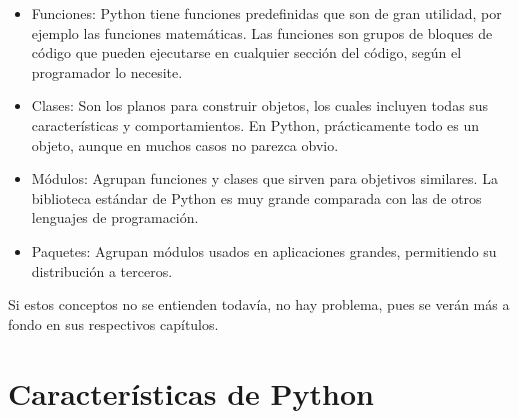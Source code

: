\documentclass{report}
\begin{document}
\begin{itemize}
  \item Funciones: Python tiene funciones predefinidas que son de gran utilidad, por ejemplo las funciones matemáticas. Las funciones son grupos de bloques de código que pueden ejecutarse en cualquier sección del código, según el programador lo necesite.
  
  \item Clases: Son los planos para construir objetos, los cuales incluyen todas sus características y comportamientos. En Python, prácticamente todo es un objeto, aunque en muchos casos no parezca obvio.
  
  \item Módulos: Agrupan funciones y clases que sirven para objetivos similares. La biblioteca estándar de Python es muy grande comparada con las de otros lenguajes de programación.
  
  \item Paquetes: Agrupan módulos usados en aplicaciones grandes, permitiendo su distribución a terceros.

\end{itemize}

Si estos conceptos no se entienden todavía, no hay problema, pues se verán más a fondo en sus respectivos capítulos.

\section{Características de Python}
\end{document}
